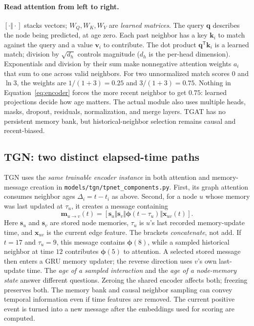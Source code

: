 \documentclass[11pt]{article}
\begin{document}
\paragraph{Read attention from left to right.}
$[\cdot\Vert\cdot]$ stacks vectors; $W_Q,W_K,W_V$ are \emph{learned matrices}. The query $\mathbf q$ describes the node being predicted, at age zero. Each past neighbor has a key $\mathbf k_i$ to match against the query and a value $\mathbf v_i$ to contribute. The dot product $\mathbf q^{\mathsf T}\mathbf k_i$ is a learned match; division by $\sqrt{d_h}$ controls magnitude ($d_h$ is the per-head dimension). Exponentials and division by their sum make nonnegative attention weights $a_i$ that sum to one across valid neighbors. For two unnormalized match scores $0$ and $\ln 3$, the weights are $1/(1+3)=0.25$ and $3/(1+3)=0.75$. Nothing in Equation~\eqref{eq:encoder} forces the more recent neighbor to get $0.75$: learned projections decide how age matters. The actual module also uses multiple heads, masks, dropout, residuals, normalization, and merge layers. TGAT has no persistent memory bank, but historical-neighbor selection remains causal and recent-biased.

\subsection{TGN: two distinct elapsed-time paths}
TGN uses the \emph{same trainable encoder instance} in both attention and memory-message creation in \texttt{models/tgn/tpnet\_components.py}. First, its graph attention consumes neighbor ages $\Delta_i=t-t_i$ as above. Second, for a node $u$ whose memory was last updated at $\tau_u$, it creates a message containing
\begin{equation}\label{eq:message}
\mathbf{m}_{u\to v}(t)=
[\mathbf{s}_u\Vert\mathbf{s}_v\Vert\boldsymbol{\phi}(t-\tau_u)\Vert\mathbf{x}_{uv}(t)].
\end{equation}
Here $\mathbf s_u$ and $\mathbf s_v$ are stored node memories, $\tau_u$ is $u$'s last recorded memory-update time, and $\mathbf x_{uv}$ is the current edge feature. The brackets \emph{concatenate}, not add. If $t=17$ and $\tau_u=9$, this message contains $\boldsymbol{\phi}(8)$, while a sampled historical neighbor at time $12$ contributes $\boldsymbol{\phi}(5)$ to attention. A selected stored message then enters a GRU memory updater; the reverse direction uses $v$'s own last-update time. The \emph{age of a sampled interaction} and the \emph{age of a node-memory state} answer different questions. Zeroing the shared encoder affects both; freezing preserves both. The memory bank and causal neighbor sampling can convey temporal information even if time features are removed. The current positive event is turned into a new message after the embeddings used for scoring are computed.
\end{document}
